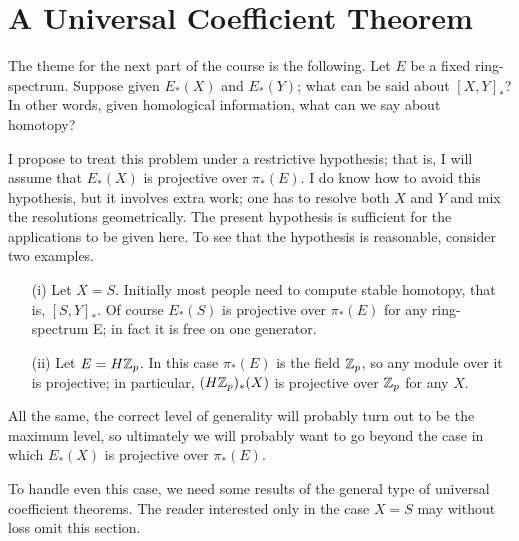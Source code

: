 \documentclass[../main]{subfiles}
\begin{document}



\chapter{A Universal Coefficient Theorem}
\label{sec:p3c13}
The theme for the next part of the course is the following. Let $E$ be a fixed ring-spectrum. Suppose given $E_\ast(X)$ and $E_\ast(Y)$; what can be said about $[X,Y]_\ast$? In other words, given homological information, what can we say about homotopy?

I propose to treat this problem under a restrictive hypothesis; that is, I will assume that $E_\ast(X)$ is projective over $\pi_\ast(E)$. I do know how to avoid this hypothesis, but it involves extra work; one has to resolve both $X$ and $Y$ and mix the resolutions geometrically. The present hypothesis is sufficient for the applications to be given here. To see that the hypothesis is reasonable, consider two examples.

\begin{examples}
\begin{enumerate}
    \item[(i)]Let $X=S$. Initially most people need to compute stable homotopy, that is, $[S, Y]_\ast$. Of course $E_\ast(S)$ is projective over $\pi_\ast(E)$ for any ring-spectrum E; in fact it is free on one generator. %
    \item[(ii)]Let $E = H\mathbb{Z}_p$. In this case $\pi_\ast(E)$ is the field $\mathbb{Z}_p$, so any module over it is projective; in particular, $(H\mathbb{Z}_p)_\ast(X)$ is projective over $\mathbb{Z}_p$ for any $X$.
\end{enumerate}
\end{examples}

All the same, the correct level of generality will probably turn out to be the maximum level, so ultimately we will probably want to go beyond the case in which $E_\ast(X)$ is projective over $\pi_\ast(E)$.

To handle even this case, we need some results of the general type of universal coefficient theorems. The reader interested only in the case $X=S$ may without loss omit this section.
\end{document}
